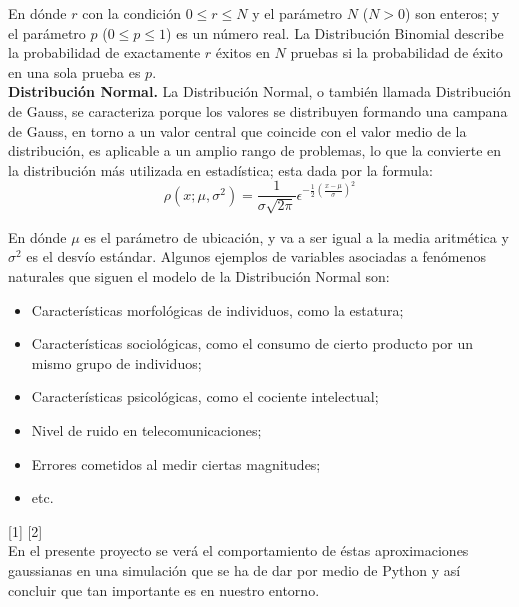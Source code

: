 \documentclass[12pt,a4paper]{article}
\begin{document}
\begin{multicols}{2}
    En dónde $r$ con la condición $0\leq r\leq N$ y el parámetro $N$ ($N>0$) son enteros; y el parámetro $p$ ($0\leq p\leq1$) es un número real. La Distribución Binomial describe la probabilidad de exactamente $r$ éxitos en $N$ pruebas si la probabilidad de éxito en una sola prueba es $p$. 
    \\ \textbf{Distribución Normal.} La Distribución Normal, o también llamada Distribución de Gauss, se caracteriza porque los valores  se distribuyen  formando una campana de Gauss, en torno  a un valor central que coincide con el valor  medio de la distribución, es aplicable a un amplio rango de problemas, lo que la convierte en la distribución más utilizada en estadística; esta dada por la formula:
    $$\rho(x;\mu,\sigma^2)=\frac{1}{\sigma\sqrt{2\pi}}\epsilon^{-\frac{1}{2}(\frac{x-\mu}{\sigma})^2}$$
    
    En dónde $\mu$ es el parámetro de ubicación, y va a ser igual a la media aritmética y $\sigma^2$ es el desvío estándar. Algunos ejemplos de variables asociadas a fenómenos naturales que siguen el modelo de la Distribución Normal son:
    \begin{itemize}
        \item Características morfológicas de individuos, como la estatura;
        \item Características sociológicas, como el consumo de cierto producto por un mismo grupo de individuos;
        \item Características psicológicas, como el cociente intelectual;
        \item Nivel de ruido en telecomunicaciones;
        \item Errores cometidos al medir ciertas magnitudes;
        \item etc.
    \end{itemize}
    
    
    [1] [2]
    \\En el presente proyecto se verá el comportamiento de éstas aproximaciones gaussianas en una simulación  que se ha de dar por medio de Python y así concluir que tan importante es en nuestro entorno.
    
    
    

\end{multicols}
\end{document}
